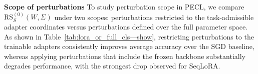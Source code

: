 \documentclass{article}
\theoremstyle{plain}
\theoremstyle{definition}
\theoremstyle{remark}
\begin{document}
\noindent\textbf{Scope of perturbations}\quad
To study perturbation scope in PECL, we compare $\mathrm{RS}^{(0)}_S(W,\Sigma)$ under two scopes: perturbations restricted to the task-admissible adapter coordinates versus perturbations defined over the full parameter space.
As shown in Table~\ref{tab:lora_or_full_cls—show}, restricting perturbations to the trainable adapters consistently improves average accuracy over the SGD baseline, whereas applying perturbations that include the frozen backbone substantially degrades performance, with the strongest drop observed for SeqLoRA.
\end{document}
